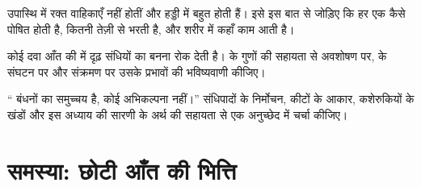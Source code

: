 \begin{exercise}[$\star\star\star$]\label{exo:b1:body-plans-tissues:10}
उपास्थि में रक्त वाहिकाएँ नहीं होतीं और हड्डी में बहुत होती हैं। इसे इस
बात से जोड़िए कि हर एक कैसे पोषित होती है, कितनी तेज़ी से भरती है, और
शरीर में कहाँ काम आती है।
\end{exercise}

\begin{exercise}[$\star\star\star$]\label{exo:b1:body-plans-tissues:11}
कोई दवा आँत की  में दृढ़ संधियों का बनना रोक देती है।  के
गुणों की सहायता से अवशोषण पर,  के संघटन पर और संक्रमण पर
उसके प्रभावों की भविष्यवाणी कीजिए।
\end{exercise}

\begin{exercise}[$\star\star\star$]\label{exo:b1:body-plans-tissues:12}
`` बंधनों का समुच्चय है, कोई अभिकल्पना नहीं।'' संधिपादों के
निर्मोचन, कीटों के आकार, कशेरुकियों के खंडों और इस अध्याय की सारणी के
अर्थ की सहायता से एक अनुच्छेद में चर्चा कीजिए।
\end{exercise}

\section{समस्या: छोटी आँत की भित्ति}

